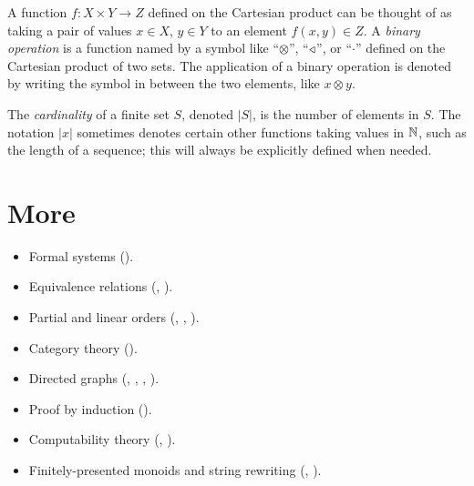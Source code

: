 \documentclass[../generics]{subfiles}
\begin{document}
A function $f\colon X\times Y\rightarrow Z$ defined on the Cartesian product can be thought of as taking a pair of values $x\in X$, $y\in Y$ to an element $f(x,y)\in Z$. A \emph{binary operation} is a function named by a symbol like ``\;$\otimes$\;'', ``\;$\triangleleft$\;'', or ``\;$\cdot$\;'' defined on the Cartesian product of two sets. The application of a binary operation is denoted by writing the symbol in between the two elements, like $x\otimes y$.

The \emph{cardinality} of a finite set $S$, denoted $|S|$, is the number of elements in $S$. The notation $|x|$ sometimes denotes certain other functions taking values in $\mathbb{N}$, such as the length of a sequence; this will always be explicitly defined when needed.

\section*{More}

\begin{itemize}
\item Formal systems ().
\item Equivalence relations (, ).
\item Partial and linear orders (, , ).
\item Category theory ().
\item Directed graphs (, , , ).
\item Proof by induction ().
\item Computability theory (, ).
\item Finitely-presented monoids and string rewriting (, ).
\end{itemize}
\end{document}
